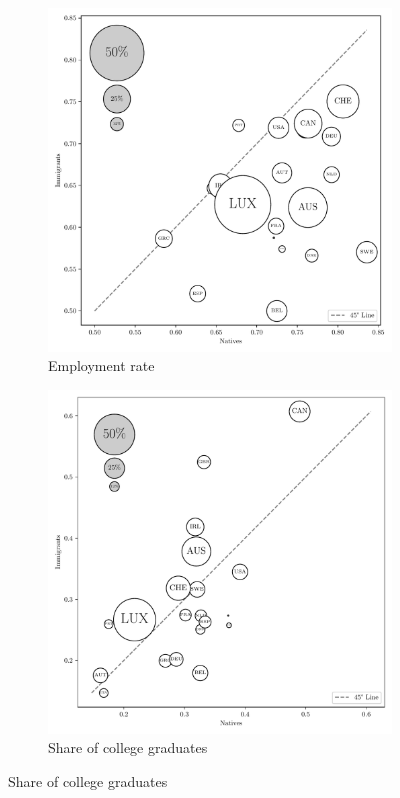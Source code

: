 \documentclass[a4paper,12pt]{article}
\begin{document}
\begin{figure}[htb!]
\begin{subfigure}{.45\linewidth}
\end{subfigure}
\\[0.5cm]
\begin{subfigure}{.45\linewidth}
  \centering
      \caption{Employment rate}
     \label{fig:stylized_facts_c}
  \includegraphics[width=\linewidth]{graphs/stylized_Employment_rate.pdf}
\end{subfigure}%
\begin{subfigure}{.45\linewidth}
  \centering
 \caption{Share of college graduates}
      \label{fig:stylized_facts_d}
  \includegraphics[width=\linewidth]{graphs/stylized_College_share.pdf}

\end{subfigure}
\end{figure}
\end{document}
